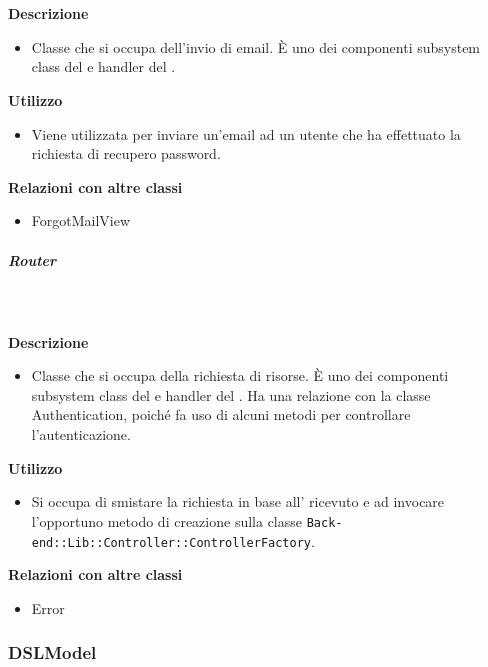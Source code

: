         \textbf{\\ \\ Descrizione} 
          \begin{itemize}
            \item[] Classe che si occupa dell'invio di email. È uno dei componenti subsystem class del   e handler del  .
          \end{itemize}      
        \textbf{Utilizzo}  
          \begin{itemize}
            \item[] Viene utilizzata per inviare un'email ad un utente che ha effettuato la richiesta di recupero password.
          \end{itemize}
          \textbf{Relazioni con altre classi}
          \begin{itemize}
              \item{ForgotMailView}
          \end{itemize}
      \subparagraph{Router}
        
        \textbf{\\ \\ Descrizione} 
          \begin{itemize}
            \item[] Classe che si occupa della richiesta di risorse. È uno dei componenti subsystem class del   e handler del  . Ha una relazione con la classe Authentication, poiché fa uso di alcuni metodi per controllare l'autenticazione.
          \end{itemize}      
        \textbf{Utilizzo}  
          \begin{itemize}
            \item[] Si occupa di smistare la richiesta in base all' ricevuto e ad invocare l'opportuno metodo di creazione sulla classe \texttt{Back-end::Lib::Controller::ControllerFactory}.
          \end{itemize}
          \textbf{Relazioni con altre classi}
          \begin{itemize}
              \item{Error}
          \end{itemize}
  \subsubsection{DSLModel}
